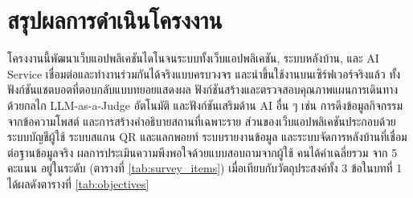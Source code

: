 
\section{สรุปผลการดำเนินโครงงาน}

โครงงานนี้พัฒนาเว็บแอปพลิเคชันไดโนจนระบบทั้งเว็บแอปพลิเคชัน, ระบบหลังบ้าน, และ AI Service เชื่อมต่อและทำงานร่วมกันได้จริงแบบครบวงจร และนำขึ้นใช้งานบนเซิร์ฟเวอร์จริงแล้ว ทั้งฟังก์ชันแชตบอตที่ตอบกลับแบบทยอยแสดงผล ฟังก์ชันสร้างและตรวจสอบคุณภาพแผนการเดินทางด้วยกลไก LLM-as-a-Judge อัตโนมัติ และฟังก์ชันเสริมด้าน AI อื่น ๆ เช่น การดึงข้อมูลกิจกรรมจากข้อความโพสต์ และการสร้างคำอธิบายสถานที่เฉพาะราย ส่วนของเว็บแอปพลิเคชันประกอบด้วยระบบบัญชีผู้ใช้ ระบบสแกน QR และแลกพอยท์ ระบบรายงานข้อมูล และระบบจัดการหลังบ้านที่เชื่อมต่อฐานข้อมูลจริง ผลการประเมินความพึงพอใจด้วยแบบสอบถามจากผู้ใช้ \surveyN{} คนได้ค่าเฉลี่ยรวม \surveyOverallMean{} จาก 5 คะแนน อยู่ในระดับ\surveyOverallLevel{} (ตารางที่ \ref{tab:survey_items}) เมื่อเทียบกับวัตถุประสงค์ทั้ง 3 ข้อในบทที่ 1 ได้ผลดังตารางที่ \ref{tab:objectives}


